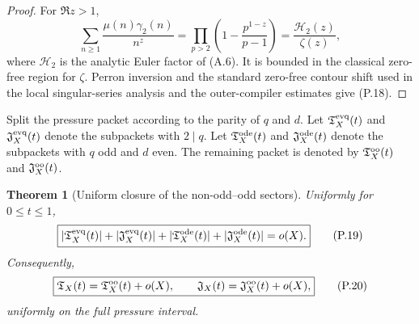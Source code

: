 \documentclass[11pt]{article}
\newtheorem{theorem}{Theorem}[section]
\theoremstyle{definition}
\theoremstyle{remark}
\begin{document}
\begin{proof}
For $\Re z>1$,
\[
 \sum_{n\ge1}\frac{\mu(n)\gamma_2(n)}{n^z}
 =\prod_{p>2}
  \left(1-\frac{p^{1-z}}{p-1}\right)
 =\frac{\mathscr H_2(z)}{\zeta(z)},
\]
where $\mathscr H_2$ is the analytic Euler factor of \textup{(A.6)}.  It is bounded in
the classical zero-free region for $\zeta$.  Perron inversion and the standard
zero-free contour shift used in the local singular-series analysis and the outer-compiler estimates give \textup{(P.18)}.
\end{proof}

Split the pressure packet according to the parity of $q$ and $d$.  Let
$\mathfrak T_X^{\rm evq}(t)$ and $\mathfrak J_X^{\rm evq}(t)$ denote the
subpackets with $2\mid q$.  Let
$\mathfrak T_X^{\rm ode}(t)$ and $\mathfrak J_X^{\rm ode}(t)$ denote the
subpackets with $q$ odd and $d$ even.  The remaining packet is denoted by
$\mathfrak T_X^{\rm oo}(t)$ and $\mathfrak J_X^{\rm oo}(t)$.

\begin{theorem}[Uniform closure of the non-odd--odd sectors]
\label{thm:affpress-parity-closure}
Uniformly for $0\le t\le1$,
\begin{equation}
 \label{eq:affpress-even-closure}
 \boxed{
 \begin{aligned}
 |\mathfrak T_X^{\rm evq}(t)|
 +|\mathfrak J_X^{\rm evq}(t)|
 +|\mathfrak T_X^{\rm ode}(t)|
 +|\mathfrak J_X^{\rm ode}(t)|
 =o(X).
 \end{aligned}}
 \tag{P.19}
\end{equation}
Consequently,
\begin{equation}
 \label{eq:affpress-odd-odd-reduction}
 \boxed{
 \mathfrak T_X(t)=\mathfrak T_X^{\rm oo}(t)+o(X),
 \qquad
 \mathfrak J_X(t)=\mathfrak J_X^{\rm oo}(t)+o(X),}
 \tag{P.20}
\end{equation}
uniformly on the full pressure interval.
\end{theorem}
\end{document}
